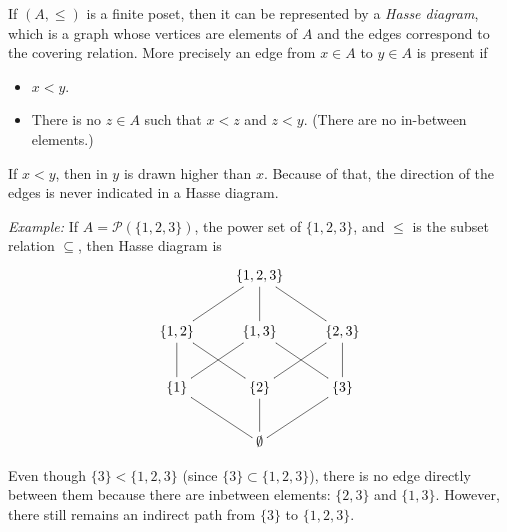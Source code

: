 \documentclass{article}
\begin{document}
If $(A,\leq)$ is a finite poset, then it can be represented by a \emph{Hasse diagram}, which is a graph whose vertices are elements of $A$ and the edges correspond to the covering relation. More precisely an edge from $x\in A$ to $y\in A$ is present if
\begin{itemize}
\item $x < y$.
\item There is no $z \in A$ such that $x < z$ and $z < y$. (There are no in-between elements.)
\end{itemize}
If $x<y$, then in $y$ is drawn higher than $x$. Because of that, the direction of the edges is never indicated in a Hasse diagram.

\emph{Example:} If $A = \mathcal{P}(\{1,2,3\})$, the power set of $\{1,2,3\}$, and $\leq$
is the subset relation $\subseteq$, then Hasse diagram is
$$\xymatrix{
                               & \{1,2,3\} &    \\
\{1,2\} \ar@{-}[ur]  & \{1,3\} \ar@{-}[u]  & \{2,3\} \ar@{-}[ul] \\
\{1\} \ar@{-}[u] \ar@{-}[ur] & \{2\} \ar@{-}[ul] \ar@{-}[ur] & \{3\} \ar@{-}[ul] \ar@{-}[u] \\
  & \emptyset \ar@{-}[ul] \ar@{-}[u] \ar@{-}[ur] & }
$$


Even though $\{3\} < \{1,2,3\}$ (since $\{3\} \subset \{1,2,3\}$), there is no edge directly between them because there are inbetween elements:
$\{2,3\}$ and $\{1,3\}$. However, there still remains an indirect path from $\{3\}$ to $\{1,2,3\}$.
\end{document}
